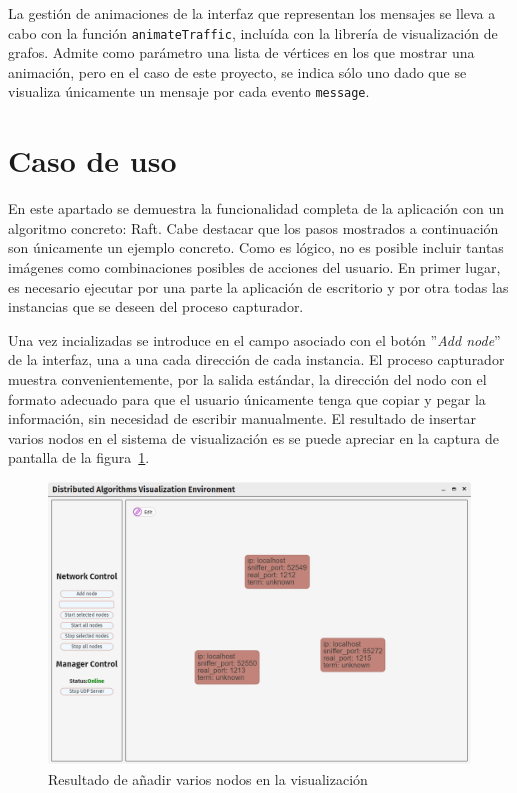 La gestión de animaciones de la interfaz que representan los mensajes se lleva a cabo con la función \texttt{animateTraffic}, incluída con la librería de visualización de grafos. Admite como parámetro una lista de vértices en los que mostrar una animación, pero en el caso de este proyecto, se indica sólo uno dado que se visualiza únicamente un mensaje por cada evento \texttt{message}.

\section{Caso de uso}

En este apartado se demuestra la funcionalidad completa de la aplicación con un algoritmo concreto: Raft. Cabe destacar que los pasos mostrados a continuación son únicamente un ejemplo concreto. Como es lógico, no es posible incluir tantas imágenes como combinaciones posibles de acciones del usuario. En primer lugar, es necesario ejecutar por una parte la aplicación de escritorio y por otra todas las instancias que se deseen del proceso capturador.

Una vez incializadas se introduce en el campo asociado con el botón ''\textit{Add node}'' de la interfaz, una a una cada dirección de cada instancia. El proceso capturador muestra convenientemente, por la salida estándar, la dirección del nodo con el formato adecuado para que el usuario únicamente tenga que copiar y pegar la información, sin necesidad de escribir manualmente. El resultado de insertar varios nodos en el sistema de visualización es se puede apreciar en la captura de pantalla de la figura~\ref{fig:ui1}.

\begin{figure}[h]
  \centering
  \includegraphics[width=0.9\linewidth]{imagenes/ui1}
  \caption{Resultado de añadir varios nodos en la visualización}
  \label{fig:ui1}
\end{figure}

